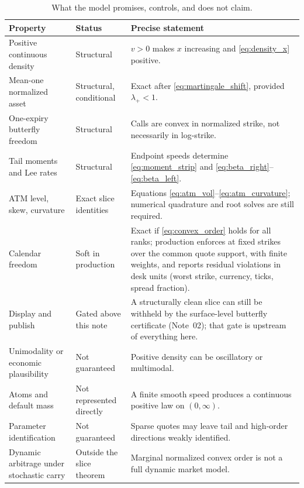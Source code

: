 \documentclass[11pt]{article}
\begin{document}
\begin{table}[H]
\centering
\caption{What the model promises, controls, and does not claim.}
\label{tab:contract}
\begin{tabular}{@{}p{}p{}p{}@{}}
\toprule
Property & Status & Precise statement\\
\midrule
Positive continuous density
& Structural
& $v>0$ makes $x$ increasing and \eqref{eq:density_x} positive.\\
Mean-one normalized asset
& Structural, conditional
& Exact after \eqref{eq:martingale_shift}, provided $\lambda_+<1$.\\
One-expiry butterfly freedom
& Structural
& Calls are convex in normalized strike, not necessarily in log-strike.\\
Tail moments and Lee rates
& Structural
& Endpoint speeds determine \eqref{eq:moment_strip} and
  \eqref{eq:beta_right}--\eqref{eq:beta_left}.\\
ATM level, skew, curvature
& Exact slice identities
& Equations \eqref{eq:atm_vol}--\eqref{eq:atm_curvature}; numerical
  quadrature and root solves are still required.\\
Calendar freedom
& Soft in production
& Exact if \eqref{eq:convex_order} holds for all ranks; production enforces
  at fixed strikes over the common quote support, with finite weights, and
  reports residual violations in desk units (worst strike, currency, ticks,
  spread fraction).\\
Display and publish
& Gated above this note
& A structurally clean slice can still be withheld by the surface-level
  butterfly certificate (Note~02); that gate is upstream of everything
  here.\\
Unimodality or economic plausibility
& Not guaranteed
& Positive density can be oscillatory or multimodal.\\
Atoms and default mass
& Not represented directly
& A finite smooth speed produces a continuous positive law on $(0,\infty)$.\\
Parameter identification
& Not guaranteed
& Sparse quotes may leave tail and high-order directions weakly identified.\\
Dynamic arbitrage under stochastic carry
& Outside the slice theorem
& Marginal normalized convex order is not a full dynamic market model.\\
\bottomrule
\end{tabular}
\end{table}
\end{document}
